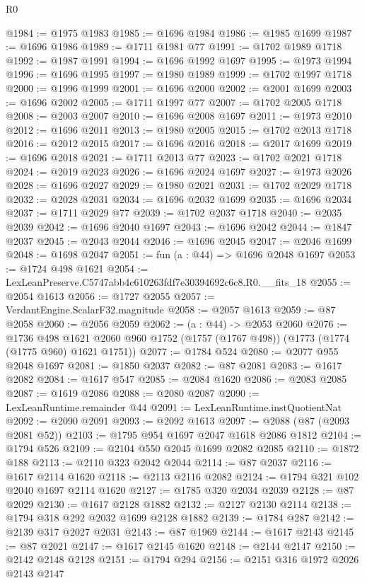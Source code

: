 \begin{lexlean}{R0}
\begin{coremodule}
@1984 := @1975 @1983
@1985 := @1696 @1984
@1986 := @1985 @1699
@1987 := @1696 @1986
@1989 := @1711 @1981 @77
@1991 := @1702 @1989 @1718
@1992 := @1987 @1991
@1994 := @1696 @1992 @1697
@1995 := @1973 @1994
@1996 := @1696 @1995
@1997 := @1980 @1989
@1999 := @1702 @1997 @1718
@2000 := @1996 @1999
@2001 := @1696 @2000
@2002 := @2001 @1699
@2003 := @1696 @2002
@2005 := @1711 @1997 @77
@2007 := @1702 @2005 @1718
@2008 := @2003 @2007
@2010 := @1696 @2008 @1697
@2011 := @1973 @2010
@2012 := @1696 @2011
@2013 := @1980 @2005
@2015 := @1702 @2013 @1718
@2016 := @2012 @2015
@2017 := @1696 @2016
@2018 := @2017 @1699
@2019 := @1696 @2018
@2021 := @1711 @2013 @77
@2023 := @1702 @2021 @1718
@2024 := @2019 @2023
@2026 := @1696 @2024 @1697
@2027 := @1973 @2026
@2028 := @1696 @2027
@2029 := @1980 @2021
@2031 := @1702 @2029 @1718
@2032 := @2028 @2031
@2034 := @1696 @2032 @1699
@2035 := @1696 @2034
@2037 := @1711 @2029 @77
@2039 := @1702 @2037 @1718
@2040 := @2035 @2039
@2042 := @1696 @2040 @1697
@2043 := @1696 @2042
@2044 := @1847 @2037
@2045 := @2043 @2044
@2046 := @1696 @2045
@2047 := @2046 @1699
@2048 := @1698 @2047
@2051 := fun (a : @44) => @1696 @2048 @1697
@2053 := @1724 @498 @1621
@2054 := LexLeanPreserve.C5747abb4c610263fdf7e30394692c6c8.R0.__fits_18
@2055 := @2054 @1613
@2056 := @1727 @2055
@2057 := VerdantEngine.ScalarF32.magnitude
@2058 := @2057 @1613
@2059 := @87 @2058
@2060 := @2056 @2059
@2062 := (a : @44) -> @2053 @2060
@2076 := @1736
    @498
    @1621
    @2060
    @960
    @1752
    (@1757 (@1767 @498))
    (@1773 (@1774 (@1775 @960) @1621 @1751))
@2077 := @1784 @524
@2080 := @2077 @955 @2048 @1697
@2081 := @1850 @2037
@2082 := @87 @2081
@2083 := @1617 @2082
@2084 := @1617 @547
@2085 := @2084 @1620
@2086 := @2083 @2085
@2087 := @1619 @2086
@2088 := @2080 @2087
@2090 := LexLeanRuntime.remainder @44
@2091 := LexLeanRuntime.instQuotientNat
@2092 := @2090 @2091
@2093 := @2092 @1613
@2097 := @2088 (@87 (@2093 @2081 @52))
@2103 := @1795 @954 @1697 @2047 @1618 @2086 @1812
@2104 := @1794 @526
@2109 := @2104 @550 @2045 @1699 @2082 @2085
@2110 := @1872 @188
@2113 := @2110 @323 @2042 @2044
@2114 := @87 @2037
@2116 := @1617 @2114 @1620
@2118 := @2113 @2116 @2082
@2124 := @1794 @321 @102 @2040 @1697 @2114 @1620
@2127 := @1785 @320 @2034 @2039
@2128 := @87 @2029
@2130 := @1617 @2128 @1882
@2132 := @2127 @2130 @2114
@2138 := @1794 @318 @292 @2032 @1699 @2128 @1882
@2139 := @1784 @287
@2142 := @2139 @317 @2027 @2031
@2143 := @87 @1969
@2144 := @1617 @2143
@2145 := @87 @2021
@2147 := @1617 @2145 @1620
@2148 := @2144 @2147
@2150 := @2142 @2148 @2128
@2151 := @1794 @294
@2156 := @2151 @316 @1972 @2026 @2143 @2147

\end{coremodule}
\end{lexlean}
